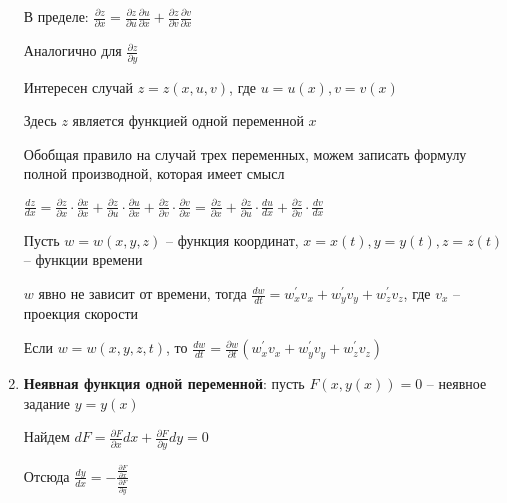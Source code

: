 \documentclass[12pt]{article}
\begin{document}
\begin{enumerate}[label*=\textbf{\arabic**} ]
\begin{MyProof}
            В пределе: $\displaystyle \frac{\partial z}{\partial x} = \frac{\partial z}{\partial u} \frac{\partial u}{\partial x} + \frac{\partial z}{\partial v} \frac{\partial v}{\partial x}$

            Аналогично для $\displaystyle \frac{\partial z}{\partial y}$
        \end{MyProof}

        \hypertarget{completederivativeoffunctionoftwovariables}{}

        \Nota Интересен случай $\displaystyle z = z(x, u, v)$, где $\displaystyle u = u(x), v = v(x)$

        Здесь $\displaystyle z$ является функцией одной переменной $\displaystyle x$

        Обобщая правило на случай трех переменных, можем записать формулу полной производной, которая имеет смысл

        $\displaystyle \frac{dz}{dx} = \frac{\partial z}{\partial x} \cdot \frac{\partial x}{\partial x} +
        \frac{\partial z}{\partial u} \cdot \frac{\partial u}{\partial x} +
        \frac{\partial z}{\partial v} \cdot \frac{\partial v}{\partial x} =
        \frac{\partial z}{\partial x} +
        \frac{\partial z}{\partial u} \cdot \frac{du}{dx} +
        \frac{\partial z}{\partial v} \cdot \frac{dv}{dx}
        $

        \Ex Пусть $\displaystyle w = w(x, y, z)$ -- функция координат, $\displaystyle x = x(t), y = y(t), z = z(t)$ -- функции времени

        $\displaystyle w$ явно не зависит от времени, тогда $\displaystyle \frac{dw}{dt} = w^\prime_x v_x + w^\prime_y v_y + w^\prime_z v_z$, где $\displaystyle v_x$ -- проекция скорости

        Если $\displaystyle w = w(x, y, z, t)$, то $\displaystyle \frac{dw}{dt} = \frac{\partial w}{\partial t} (w^\prime_x v_x + w^\prime_y v_y + w^\prime_z v_z)$
        
        \item \textbf{Неявная функция одной переменной}: пусть $\displaystyle F(x, y(x)) = 0$ -- неявное задание $\displaystyle y = y(x)$

        Найдем $\displaystyle dF = \frac{\partial F}{\partial x} dx + \frac{\partial F}{\partial y} dy = 0$

        Отсюда $\displaystyle \frac{dy}{dx} = -\frac{\frac{\partial F}{\partial x}}{\frac{\partial F}{\partial y}}$
    \end{enumerate}
    
\end{document}
